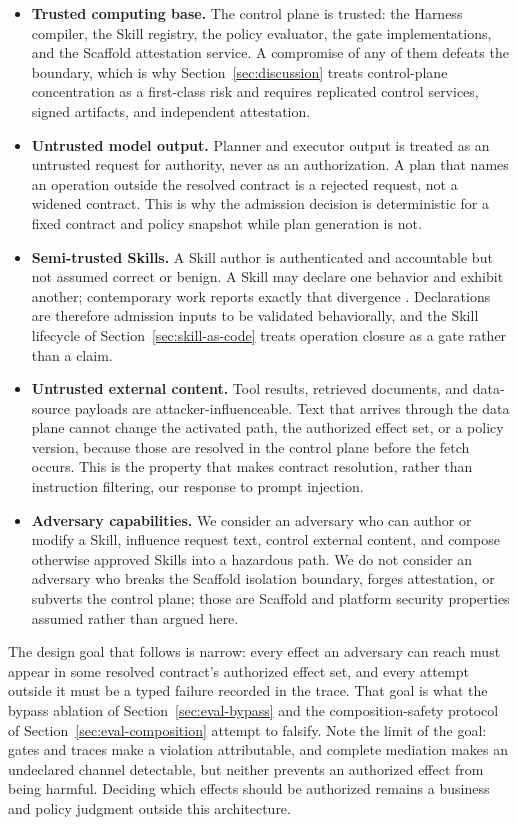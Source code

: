 \begin{itemize}
\item \textbf{Trusted computing base.} The control plane is trusted: the Harness compiler,
the Skill registry, the policy evaluator, the gate implementations, and the Scaffold
attestation service. A compromise of any of them defeats the boundary, which is why
Section~\ref{sec:discussion} treats control-plane concentration as a first-class risk and
requires replicated control services, signed artifacts, and independent attestation.
\item \textbf{Untrusted model output.} Planner and executor output is treated as an
untrusted request for authority, never as an authorization. A plan that names an operation
outside the resolved contract is a rejected request, not a widened contract. This is why the
admission decision is deterministic for a fixed contract and policy snapshot while plan
generation is not.
\item \textbf{Semi-trusted Skills.} A Skill author is authenticated and accountable but not
assumed correct or benign. A Skill may declare one behavior and exhibit another; contemporary
work reports exactly that divergence \cite{zhang2026misalignment}. Declarations are therefore
admission inputs to be validated behaviorally, and the Skill lifecycle of
Section~\ref{sec:skill-as-code} treats operation closure as a gate rather than a claim.
\item \textbf{Untrusted external content.} Tool results, retrieved documents, and data-source
payloads are attacker-influenceable. Text that arrives through the data plane cannot change
the activated path, the authorized effect set, or a policy version, because those are resolved
in the control plane before the fetch occurs. This is the property that makes contract
resolution, rather than instruction filtering, our response to prompt injection.
\item \textbf{Adversary capabilities.} We consider an adversary who can author or modify a
Skill, influence request text, control external content, and compose otherwise approved Skills
into a hazardous path. We do not consider an adversary who breaks the Scaffold isolation
boundary, forges attestation, or subverts the control plane; those are Scaffold and platform
security properties assumed rather than argued here.
\end{itemize}

The design goal that follows is narrow: every effect an adversary can reach must appear in
some resolved contract's authorized effect set, and every attempt outside it must be a typed
failure recorded in the trace. That goal is what the bypass ablation of
Section~\ref{sec:eval-bypass} and the composition-safety protocol of
Section~\ref{sec:eval-composition} attempt to falsify. Note the limit of the goal: gates and
traces make a violation attributable, and complete mediation makes an undeclared channel
detectable, but neither prevents an authorized effect from being harmful. Deciding which
effects should be authorized remains a business and policy judgment outside this architecture.

